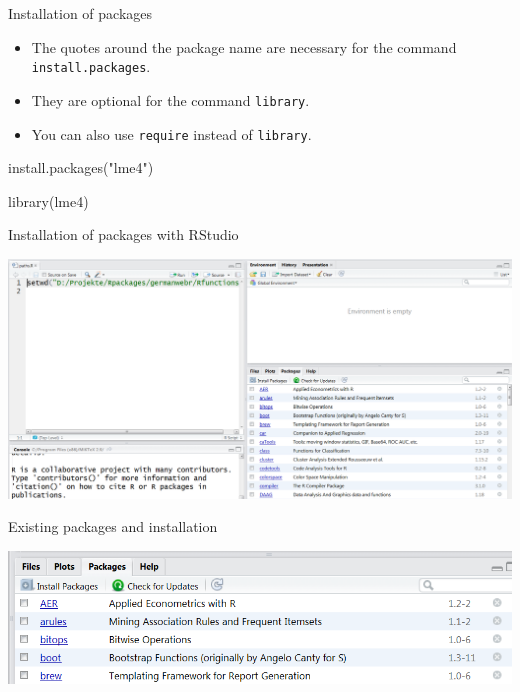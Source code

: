 \documentclass[
  10pt,
  ignorenonframetext,
]{beamer}
\newenvironment{Shaded}{\begin{snugshade}}{\end{snugshade}}
\newcommand{\KeywordTok}[1]{\textcolor[rgb]{0.94,0.87,0.69}{#1}}
\newcommand{\NormalTok}[1]{\textcolor[rgb]{0.80,0.80,0.80}{#1}}
\newcommand{\StringTok}[1]{\textcolor[rgb]{0.80,0.58,0.58}{#1}}
\providecommand{\tightlist}{%
  \setlength{\itemsep}{0pt}\setlength{\parskip}{0pt}}
\begin{document}
\begin{frame}[fragile]{Installation of packages}
\protect\hypertarget{installation-of-packages}{}

\begin{itemize}
\tightlist
\item
  The quotes around the package name are necessary for the command
  \texttt{install.packages}.
\item
  They are optional for the command \texttt{library}.
\item
  You can also use \texttt{require} instead of \texttt{library}.
\end{itemize}

\begin{Shaded}
\begin{Highlighting}[]
\KeywordTok{install.packages}\NormalTok{(}\StringTok{"lme4"}\NormalTok{)}

\KeywordTok{library}\NormalTok{(lme4)}
\end{Highlighting}
\end{Shaded}

\end{frame}

\begin{frame}{Installation of packages with RStudio}
\protect\hypertarget{installation-of-packages-with-rstudio}{}

\includegraphics{figure/PaketeRstudio.PNG}

\end{frame}

\begin{frame}{Existing packages and installation}
\protect\hypertarget{existing-packages-and-installation}{}

\includegraphics{figure/packages3.PNG}

\end{frame}
\end{document}
